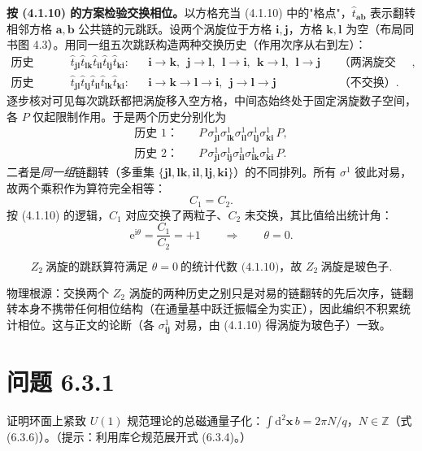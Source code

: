 \textbf{按 (4.1.10) 的方案检验交换相位。}以方格充当 (4.1.10) 中的"格点"，$\hat t_{\pmb{ab}}$ 表示翻转相邻方格 $\pmb a,\pmb b$ 公共链的元跳跃。设两个涡旋位于方格 $\pmb i,\pmb j$，方格 $\pmb k,\pmb l$ 为空（布局同书图 4.3）。用同一组五次跳跃构造两种交换历史（作用次序从右到左）：
\begin{align*}
\text{历史 1：}&\quad \hat t_{\pmb{jl}}\hat t_{\pmb{lk}}\hat t_{\pmb{il}}\hat t_{\pmb{lj}}\hat t_{\pmb{ki}} :
&& \pmb i\to\pmb k,\ \ \pmb j\to\pmb l,\ \ \pmb l\to\pmb i,\ \ \pmb k\to\pmb l,\ \ \pmb l\to\pmb j
&& \text{（两涡旋交换）},\\
\text{历史 2：}&\quad \hat t_{\pmb{jl}}\hat t_{\pmb{lj}}\hat t_{\pmb{il}}\hat t_{\pmb{lk}}\hat t_{\pmb{ki}} :
&& \pmb i\to\pmb k\to\pmb l\to\pmb i,\ \ \pmb j\to\pmb l\to\pmb j
&& \text{（不交换）}.
\end{align*}
逐步核对可见每次跳跃都把涡旋移入空方格，中间态始终处于固定涡旋数子空间，各 $P$ 仅起限制作用。于是两个历史分别化为
\begin{align*}
\text{历史 1：}&\quad P\,\sigma^1_{\pmb{jl}}\sigma^1_{\pmb{lk}}\sigma^1_{\pmb{il}}\sigma^1_{\pmb{lj}}\sigma^1_{\pmb{ki}}\,P ,\\
\text{历史 2：}&\quad P\,\sigma^1_{\pmb{jl}}\sigma^1_{\pmb{lj}}\sigma^1_{\pmb{il}}\sigma^1_{\pmb{lk}}\sigma^1_{\pmb{ki}}\,P .
\end{align*}
二者是\emph{同一组}链翻转（多重集 $\{\pmb{jl},\pmb{lk},\pmb{il},\pmb{lj},\pmb{ki}\}$）的不同排列。所有 $\sigma^1$ 彼此对易，故两个乘积作为算符完全相等：
\begin{equation*}
C_1=C_2 .
\end{equation*}
按 (4.1.10) 的逻辑，$C_1$ 对应交换了两粒子、$C_2$ 未交换，其比值给出统计角：
\begin{equation*}
\mathrm{e}^{\mathrm{i}\theta}=\frac{C_1}{C_2}=+1
\qquad\Longrightarrow\qquad
\theta=0 .
\end{equation*}

\begin{equation*}
\boxed{\ Z_2\ \text{涡旋的跳跃算符满足 }\theta=0\ \text{的统计代数 (4.1.10)，故 } Z_2\ \text{涡旋是玻色子}.\ }
\end{equation*}

物理根源：交换两个 $Z_2$ 涡旋的两种历史之别只是对易的链翻转的先后次序，链翻转本身不携带任何相位结构（在通量基中跃迁振幅全为实正），因此编织不积累统计相位。这与正文的论断（各 $\sigma^1_{\pmb{ij}}$ 对易，由 (4.1.10) 得涡旋为玻色子）一致。
\section*{问题 6.3.1}
\begin{problem}
证明环面上紧致 $U(1)$ 规范理论的总磁通量子化：$\int\mathrm{d}^2\pmb x\,b=2\pi N/q$，$N\in\mathbb{Z}$（式 (6.3.6)）。（提示：利用库仑规范展开式 (6.3.4)。）
\end{problem}
\solution

